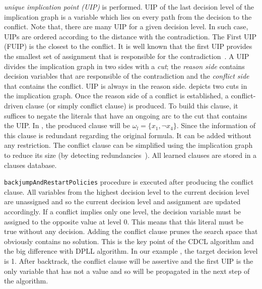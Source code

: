 \emph{unique implication point (UIP)} is performed. UIP of the last decision level of the implication graph is a variable
which lies on every path from the decision to the conflict. Note that, there are many UIP for a given decision level.
In such case, UIPs are ordered according to the distance with the contradiction. The First UIP (FUIP) is the closest to
the conflict. It is well known that the first UIP provides the smallest set of assignment that is responsible for the
contradiction~\cite{zhang2001efficient}.
A UIP divides the implication graph in two sides with a \emph{cut}; the \emph{reason side} contains decision variables 
that are responsible of the contradiction and the \emph{conflict side} that contains the conflict. 
 UIP is always in the reason side.  depicts two cuts in the implication graph.
Once the reason side of a conflict is established, a conflict-driven clause (or simply conflict clause) is produced.
To build this clause, it suffices to negate the
literals that have an ongoing arc to the  cut that contains the UIP. In , the produced
clause will be $\omega_l = \{x_1, \neg x_4 \}$. Since the information of this clause is redundant regarding 
the original formula. It can be added without any  restriction. The conflict clause can be simplified
using the implication graph to reduce its size (by detecting redundancies~\cite{sorensson2009minimizing}).
 All learned clauses are stored in a clauses database.
 
  \texttt{backjumpAndRestartPolicies} procedure is executed after producing the conflict clause.
All variables from the highest decision level to the current decision level are unassigned and so 
the current decision level and assignment are updated accordingly.
If a conflict implies only one level, the decision variable must be assigned 
to the opposite value at level 0. This means that this literal must be true without any decision.
Adding the conflict clause prunes the search space that obviously contains no solution.
This is the key point of the CDCL algorithm and the big difference with DPLL algorithm.
 In our example , the target decision level is 1.
After backtrack, the conflict clause will be assertive and the first UIP is the only variable that has
not a value and so will be propagated in the next step of the algorithm.
 
